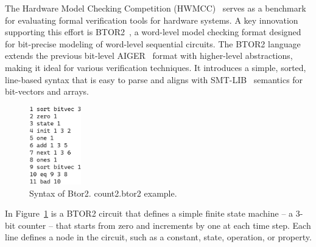 

The Hardware Model Checking Competition (HWMCC)~\cite{hwmcc} serves as a benchmark for evaluating formal verification tools for hardware systems. A key innovation supporting this effort is BTOR2~\cite{btor2}, a word-level model checking format designed for bit-precise modeling of word-level sequential circuits.
The BTOR2 language extends the previous bit-level AIGER~\cite{AIGER} format with higher-level abstractions, making it ideal for various verification techniques. It introduces a simple, sorted, line-based syntax that is easy to parse and aligns with SMT-LIB~\cite{SMT-LIB} semantics for bit-vectors and arrays.


\begin{figure}
  \centering
  \includegraphics[width=0.2\textwidth]{figures/count2.png}
  \caption{ Syntax of Btor2. count2.btor2 example.  }
  \label{fig:count2}
\end{figure}

In Figure~\ref{fig:count2} is a BTOR2 circuit that defines a simple finite state machine -- a 3-bit counter -- that starts from zero and increments by one at each time step. Each line defines a node in the circuit, such as a constant, state, operation, or property.

